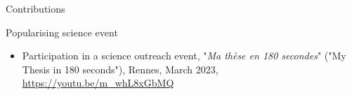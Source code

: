 \begin{frame}[allowframebreaks]{Contributions}
    \begin{block}{Popularising science event}
        \begin{itemize}
            \item {\small Participation in a science outreach event, "\textit{Ma thèse en 180 secondes}" ("My Thesis in 180 seconds"), Rennes, March 2023, \url{https://youtu.be/m_whL8xGbMQ}}
        \end{itemize}
    \end{block}
\end{frame}
\begin{frame}
    \backpage
\end{frame}
